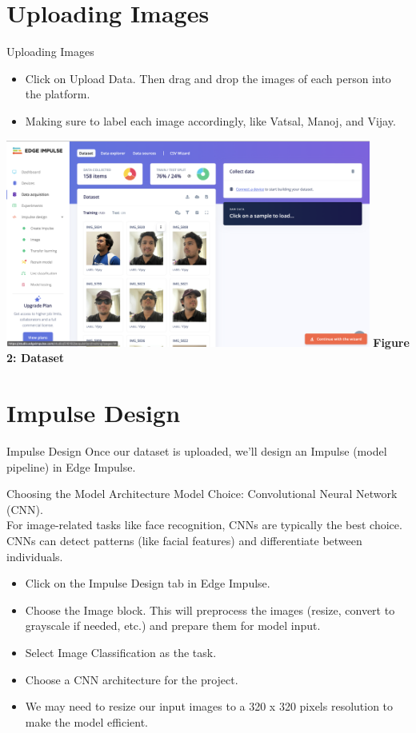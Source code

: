 \documentclass[10pt, a4paper]{beamer}
\begin{document}
	\section{Uploading Images}	
\begin{frame}{Uploading Images}
		\begin{block}{}
			\begin{itemize}
				\item Click on Upload Data. Then drag and drop the images of each person into the platform.
				\item Making sure to label each image accordingly, like Vatsal, Manoj, and Vijay.
		\end{itemize}
			
			\centering
			\includegraphics[width=0.9\textwidth]{images/DataSet.png}
			\textbf{Figure 2: Dataset}
			
		\end{block}
\end{frame}

	\section{Impulse Design}
\begin{frame}{Impulse Design}
	Once our dataset is uploaded, we'll design an Impulse (model pipeline) in Edge Impulse.
	
	\begin{block}{Choosing the Model Architecture}
		Model Choice: Convolutional Neural Network (CNN). \\
		For image-related tasks like face recognition, CNNs are typically the best choice. CNNs can detect patterns (like facial features) and differentiate between individuals.
			\begin{itemize}
				\item Click on the Impulse Design tab in Edge Impulse.
				\item Choose the Image block. This will preprocess the images (resize, convert to grayscale if needed, etc.) and prepare them for model input.
				\item Select Image Classification as the task.
				\item Choose a CNN architecture for the project.
				\item We may need to resize our input images to a 320 x 320 pixels resolution to make the model efficient.
			\end{itemize}

\end{block}	
\end{frame}		
\end{document}
